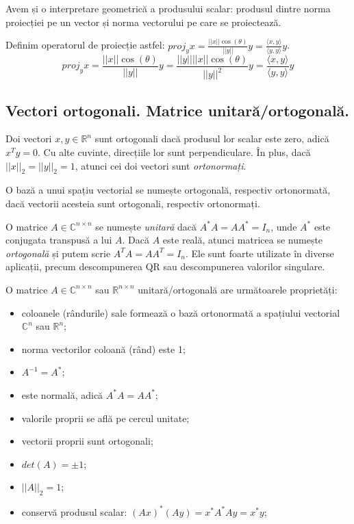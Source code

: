 \documentclass{exam}
\begin{document}
Avem și o interpretare geometrică a produsului scalar: produsul dintre
norma proiecției pe un vector și norma vectorului pe care se proiectează.

Definim operatorul de proiecție astfel: $proj_y x = \frac{||x|| \cos (\theta)}{||y||} y = \frac{\langle x, y \rangle}{\langle y, y \rangle} y$.
\begin{equation*}
	proj_y x = \frac{||x|| \cos (\theta)}{||y||} y = \frac{||y||||x|| \cos (\theta)}{||y||^2} y = \frac{\langle x, y \rangle}{\langle y, y \rangle} y
\end{equation*}

\subsection{Vectori ortogonali. Matrice unitară/ortogonală.}

Doi vectori $x, y \in \mathbb{R}^n$ sunt ortogonali dacă produsul lor
scalar este zero, adică $x^Ty = 0$. Cu alte cuvinte, direcțiile lor sunt
perpendiculare. În plus, dacă $||x||_2 = ||y||_2 = 1$, atunci cei doi
vectori sunt \textit{ortonormați}.

O bază a unui spațiu vectorial se numește ortogonală, respectiv ortonormată,
dacă vectorii acesteia sunt ortogonali, respectiv ortonormați.

O matrice $A \in \mathbb{C}^{n \times n}$ se numește \textit{unitară} dacă
$A^*A = AA^* = I_n$, unde $A^*$ este conjugata transpusă a lui $A$. Dacă $A$
este reală, atunci matricea se numește \textit{ortogonală} și putem scrie
$A^TA = AA^T = I_n$. Ele sunt foarte utilizate în diverse aplicații, precum
descompunerea QR sau descompunerea valorilor singulare.

O matrice $A \in \mathbb{C}^{n \times n}$ sau $\mathbb{R}^{n \times n}$
unitară/ortogonală are următoarele proprietăți:

\begin{itemize}
	\item coloanele (rândurile) sale formează o bază ortonormată a spațiului
	      vectorial $\mathbb{C}^n$ sau $\mathbb{R}^n$;
	\item norma vectorilor coloană (rând) este 1;
	\item $A^{-1} = A^*$;
	\item este normală, adică $A^*A = AA^*$;
	\item valorile proprii se află pe cercul unitate;
	\item vectorii proprii sunt ortogonali;
	\item $det(A) = \pm 1$;
	\item $||A||_2 = 1$;
	\item conservă produsul scalar: $(Ax)^*(Ay) = x^*A^*Ay = x^*y$;
\end{itemize}
\end{document}
